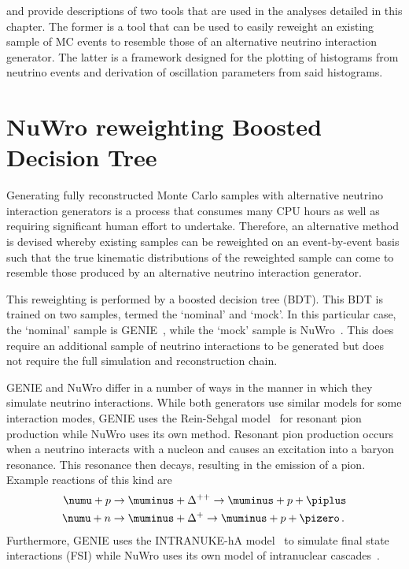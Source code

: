  and  provide descriptions of two tools that are used in the analyses detailed in this chapter.
The former is a tool that can be used to easily reweight an existing sample of MC events to resemble those of an alternative neutrino interaction generator.
The latter is a framework designed for the plotting of histograms from neutrino events and derivation of oscillation parameters from said histograms.

\section{NuWro reweighting Boosted Decision Tree}
\label{sec:dune_ndrwt:bdt}

Generating fully reconstructed Monte Carlo samples with alternative neutrino interaction generators is a process that consumes many CPU hours as well as requiring significant human effort to undertake.
Therefore, an alternative method is devised whereby existing samples can be reweighted on an event-by-event basis such that the true kinematic distributions of the reweighted sample can come to resemble those produced by an alternative neutrino interaction generator.

This reweighting is performed by a boosted decision tree (BDT).
This BDT is trained on two samples, termed the `nominal' and `mock'.
In this particular case, the `nominal' sample is GENIE~\cite{genie}, while the `mock' sample is NuWro~\cite{nuwro}.
This does require an additional sample of neutrino interactions to be generated but does not require the full simulation and reconstruction chain.

GENIE and NuWro differ in a number of ways in the manner in which they simulate neutrino interactions.
While both generators use similar models for some interaction modes, GENIE uses the Rein-Sehgal model~\cite{reinSehgal} for resonant pion production while NuWro uses its own method.
Resonant pion production occurs when a neutrino interacts with a nucleon and causes an excitation into a baryon resonance. 
This resonance then decays, resulting in the emission of a pion.
Example reactions of this kind are 
\begin{align}
	\numu + p &\rightarrow \muminus + \Delta^{++} \rightarrow \muminus + p + \piplus \\
	\numu + n &\rightarrow \muminus + \Delta^{+} \rightarrow \muminus + p + \pizero \, . 
\end{align}
Furthermore, GENIE uses the INTRANUKE-hA model~\cite{intranuke} to simulate final state interactions (FSI) while NuWro uses its own model of intranuclear cascades~\cite{nuwroCascade}.

